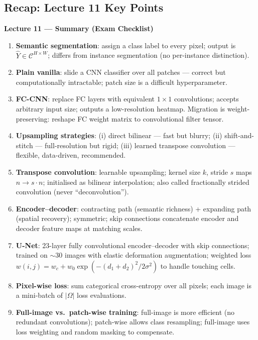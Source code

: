 \documentclass[11pt,a4paper]{article}
\begin{document}
\subsection{Recap: Lecture 11 Key Points}
\label{sec:recap_semseg}

\begin{tcolorbox}[colback=WarningRedBg,colframe=WarningRed,boxrule=0.8pt,arc=3pt]
\textbf{Lecture 11 — Summary (Exam Checklist)}
\begin{enumerate}
  \item \textbf{Semantic segmentation}: assign a class label to every pixel; output is $\hat{Y} \in \mathcal{C}^{H\times W}$; differs from instance segmentation (no per-instance distinction).
  \item \textbf{Plain vanilla}: slide a CNN classifier over all patches — correct but computationally intractable; patch size is a difficult hyperparameter.
  \item \textbf{FC-CNN}: replace FC layers with equivalent $1\times1$ convolutions; accepts arbitrary input size; outputs a low-resolution heatmap. Migration is weight-preserving: reshape FC weight matrix to convolutional filter tensor.
  \item \textbf{Upsampling strategies}: (i) direct bilinear — fast but blurry; (ii) shift-and-stitch — full-resolution but rigid; (iii) learned transpose convolution — flexible, data-driven, recommended.
  \item \textbf{Transpose convolution}: learnable upsampling; kernel size $k$, stride $s$ maps $n \to s\cdot n$; initialised as bilinear interpolation; also called fractionally strided convolution (never ``deconvolution'').
  \item \textbf{Encoder--decoder}: contracting path (semantic richness) + expanding path (spatial recovery); symmetric; skip connections concatenate encoder and decoder feature maps at matching scales.
  \item \textbf{U-Net}: 23-layer fully convolutional encoder--decoder with skip connections; trained on $\sim$30 images with elastic deformation augmentation; weighted loss $w(i,j) = w_c + w_0\exp(-(d_1+d_2)^2/2\sigma^2)$ to handle touching cells.
  \item \textbf{Pixel-wise loss}: sum categorical cross-entropy over all pixels; each image is a mini-batch of $|\Omega|$ loss evaluations.
  \item \textbf{Full-image vs.\ patch-wise training}: full-image is more efficient (no redundant convolutions); patch-wise allows class resampling; full-image uses loss weighting and random masking to compensate.
\end{enumerate}
\end{tcolorbox}
\end{document}
